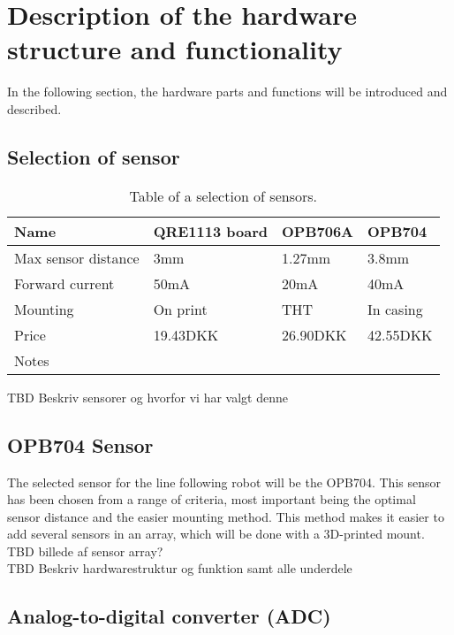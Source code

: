 \section{Description of the hardware structure and functionality}
In the following section, the hardware parts and functions will be introduced and described.
\subsection{Selection of sensor}

\begin{table}[htbp]
    \begin{tabular}{|l|l|l|l|}
        \hline
        Name                & QRE1113 board & OPB706A  & OPB704    \\ \hline
        Max sensor distance & 3mm                            & 1.27mm   & 3.8mm     \\ \hline
        Forward current     & 50mA                           & 20mA     & 40mA      \\ \hline
        Mounting            & On print                       & THT      & In casing \\ \hline
        Price               & 19.43DKK                       & 26.90DKK & 42.55DKK  \\ \hline
        Notes               & ~                              & ~        & ~         \\
        \hline
    \end{tabular}
    \caption{Table of a selection of sensors.}
\label{sensor_table}
\end{table}


TBD Beskriv sensorer og hvorfor vi har valgt denne
\newline
\subsection{OPB704 Sensor}
The selected sensor for the line following robot will be the OPB704. This sensor has been chosen from a range of criteria, most important being the optimal sensor distance and the easier mounting method. This method makes it easier to add several sensors in an array, which will be done with a 3D-printed mount. 
TBD billede af sensor array?
\newline 
\\
TBD Beskriv hardwarestruktur og funktion samt alle underdele


\subsection{Analog-to-digital converter (ADC)}

